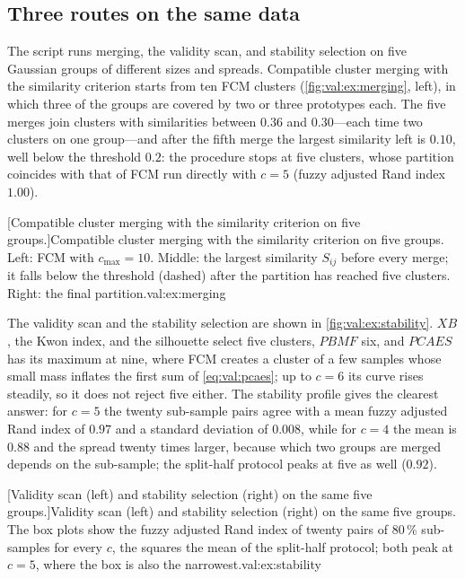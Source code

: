 \subsection{Three routes on the same data}\label{sec:val:ex:routes}

The script  runs merging, the validity scan, and stability selection on five Gaussian groups of different sizes and spreads. Compatible cluster merging with the similarity criterion starts from ten FCM clusters (\cref{fig:val:ex:merging}, left), in which three of the groups are covered by two or three prototypes each. The five merges join clusters with similarities between $0.36$ and $0.30$---each time two clusters on one group---and after the fifth merge the largest similarity left is $0.10$, well below the threshold $0.2$: the procedure stops at five clusters, whose partition coincides with that of FCM run directly with $c=5$ (fuzzy adjusted Rand index $1.00$).

[Compatible cluster merging with the similarity criterion on five groups.]{Compatible cluster merging with the similarity criterion on five groups. Left: FCM with $c_{\max}=10$. Middle: the largest similarity $S_{ij}$ before every merge; it falls below the threshold (dashed) after the partition has reached five clusters. Right: the final partition.}{val:ex:merging}

The validity scan and the stability selection are shown in \cref{fig:val:ex:stability}. $XB$, the Kwon index, and the silhouette select five clusters, $PBMF$ six, and $PCAES$ has its maximum at nine, where FCM creates a cluster of a few samples whose small mass inflates the first sum of \eqref{eq:val:pcaes}; up to $c=6$ its curve rises steadily, so it does not reject five either. The stability profile gives the clearest answer: for $c=5$ the twenty sub-sample pairs agree with a mean fuzzy adjusted Rand index of $0.97$ and a standard deviation of $0.008$, while for $c=4$ the mean is $0.88$ and the spread twenty times larger, because which two groups are merged depends on the sub-sample; the split-half protocol peaks at five as well ($0.92$).

[Validity scan (left) and stability selection (right) on the same five groups.]{Validity scan (left) and stability selection (right) on the same five groups. The box plots show the fuzzy adjusted Rand index of twenty pairs of 80\,\% sub-samples for every $c$, the squares the mean of the split-half protocol; both peak at $c=5$, where the box is also the narrowest.}{val:ex:stability}

